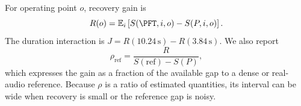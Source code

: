 For operating point $o$, recovery gain is
\begin{equation}
R(o)=\mathbb{E}_{i}\left[S(\PFT,i,o)-S(P,i,o)\right].
\end{equation}
The duration interaction is $J=R(10.24\,\mathrm{s})-R(3.84\,\mathrm{s})$. We also report
\begin{equation}
\rho_{\mathrm{ref}}=\frac{R}{S(\mathrm{ref})-S(P)},
\end{equation}
which expresses the gain as a fraction of the available gap to a dense or real-audio reference. Because $\rho$ is a ratio of estimated quantities, its interval can be wide when recovery is small or the reference gap is noisy.

%
%
%
